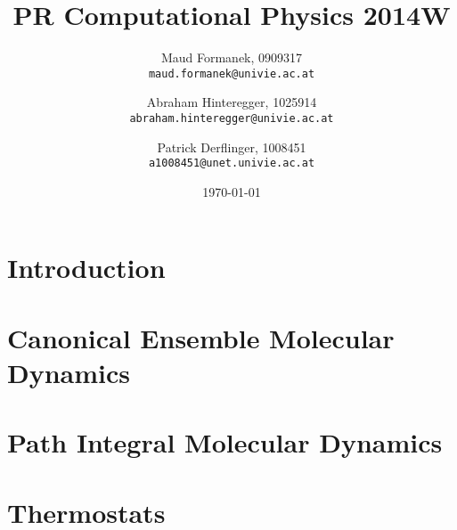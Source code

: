 \documentclass[a4paper]{article}
\title{PR Computational Physics 2014W}
\author{
	Maud Formanek, 0909317\\
    \texttt{maud.formanek@univie.ac.at}
	\and
    Abraham Hinteregger,  1025914\\
    \texttt{abraham.hinteregger@univie.ac.at}\and
    Patrick Derflinger,  1008451\\
    \texttt{a1008451@unet.univie.ac.at}
    }
\date{\today}
\begin{document}
\maketitle
\tableofcontents

\newpage

\section{Introduction} \label{intro}

\section{Canonical Ensemble Molecular Dynamics} \label{cemd}

\section{Path Integral Molecular Dynamics} \label{pimd}

\section{Thermostats} \label{thermostats}








\end{document}
